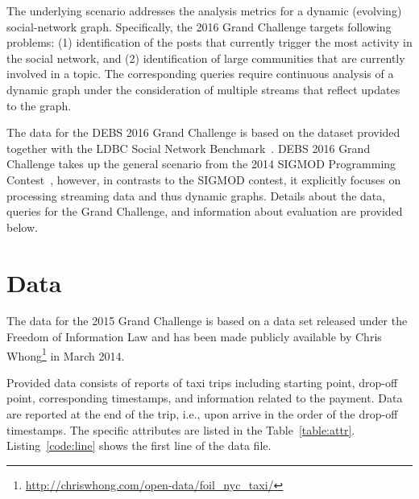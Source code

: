 \documentclass{sig-alternate}
\begin{document}
The underlying scenario addresses the analysis metrics for a dynamic (evolving) social-network graph. Specifically, the 2016 Grand Challenge targets following problems: (1) identification of the posts that currently trigger the most activity in the social network, and (2) identification of large communities that are currently involved in a topic. The corresponding queries require continuous analysis of a dynamic graph under the consideration of multiple streams that reflect updates to the graph.

The data for the DEBS 2016 Grand Challenge is based on the dataset provided together with the LDBC Social Network Benchmark~\cite{erling2015social}. DEBS 2016 Grand Challenge takes up the general scenario from the 2014 SIGMOD Programming Contest~\cite{DBLP:conf/sigmod/2014}, however, in contrasts to the SIGMOD contest, it explicitly focuses on processing streaming data and thus dynamic graphs. Details about the data, queries for the Grand Challenge, and information about evaluation are provided below.

\section{Data}
\label{sec:data}
The data for the 2015 Grand Challenge is based on a data set released under the Freedom of Information Law and has been made publicly available by Chris Whong\footnote{\url{http://chriswhong.com/open-data/foil_nyc_taxi/}} in March 2014.

Provided data consists of reports of taxi trips including starting point, drop-off point, corresponding timestamps, and information related to the payment. Data are reported at the end of the trip, i.e., upon arrive in the order of the drop-off timestamps.
The specific attributes are listed in the Table~\ref{table:attr}. Listing~\ref{code:line} shows the first line of the data file.

\end{document}
